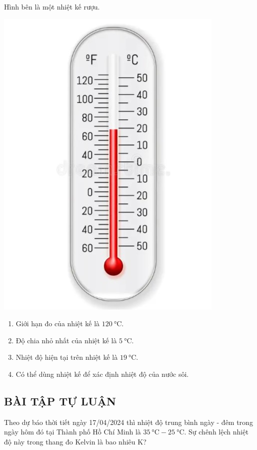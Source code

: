 	\begin{ex}
		Hình bên là một nhiệt kế rượu.
		\begin{center}
			\includegraphics[width=0.25\linewidth]{figs/VN12-Y24-PH-SYL-002P-2}
		\end{center}
		\begin{enumerate}[label=\alph*)]
			\item Giới hạn đo của nhiệt kế là $\SI{120}{\celsius}$.
			\item Độ chia nhỏ nhất của nhiệt kế là $\SI{5}{\celsius}$.
			\item Nhiệt độ hiện tại trên nhiệt kế là $\SI{19}{\celsius}$.
			\item Có thể dùng nhiệt kế để xác định nhiệt độ của nước sôi.
		\end{enumerate}

		\end{ex}
\subsection{BÀI TẬP TỰ LUẬN}
\setcounter{ex}{0}
\begin{ex}
	Theo dự báo thời tiết ngày 17/04/2024 thì nhiệt độ trung bình ngày - đêm trong
	ngày hôm đó tại Thành phố Hồ Chí Minh là  $\SI{35}{\celsius}-\SI{25}{\celsius}$. Sự chênh lệch nhiệt độ này trong thang đo Kelvin là bao nhiêu $\si{\kelvin}$?
	\end{ex}

